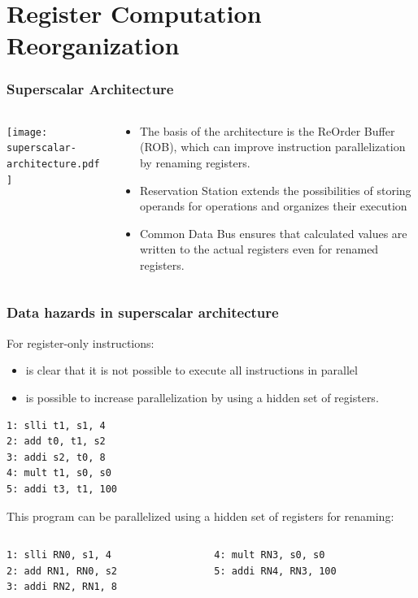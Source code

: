 \documentclass{beamer}
\begin{document}
\section{Register Computation Reorganization}

\begin{frame}
\frametitle{Superscalar Architecture}
\begin{columns}
\begin{column}{0.55\textwidth}
\texttt{[image: superscalar-architecture.pdf]}
\end{column}
\begin{column}{0.45\textwidth}
\begin{itemize}
\item The basis of the architecture is the ReOrder Buffer (ROB), which can improve instruction parallelization by renaming registers.
\item Reservation Station extends the possibilities of storing operands for operations and organizes their execution
\item Common Data Bus ensures that calculated values are written to the actual registers even for renamed registers.
\end{itemize}
\end{column}
\end{columns}
\end{frame}


\begin{frame}[fragile]
\frametitle{Data hazards in superscalar architecture}

For register-only instructions:
\begin{itemize}
\item is clear that it is not possible to execute all instructions in parallel
\item is possible to increase parallelization by using a hidden set of registers.
\end{itemize}

\begin{verbatim}
1: slli t1, s1, 4
2: add t0, t1, s2
3: addi s2, t0, 8
4: mult t1, s0, s0
5: addi t3, t1, 100
\end{verbatim}

This program can be parallelized using a hidden set of registers for renaming:

\begin{columns}[T]
\begin{column}{0.40\textwidth}
\begin{verbatim}
1: slli RN0, s1, 4
2: add RN1, RN0, s2
3: addi RN2, RN1, 8
\end{verbatim}
\end{column}
\begin{column}{0.40\textwidth}
\begin{verbatim}
4: mult RN3, s0, s0
5: addi RN4, RN3, 100
\end{verbatim}
\end{column}
\end{columns}
\end{frame}
\end{document}
